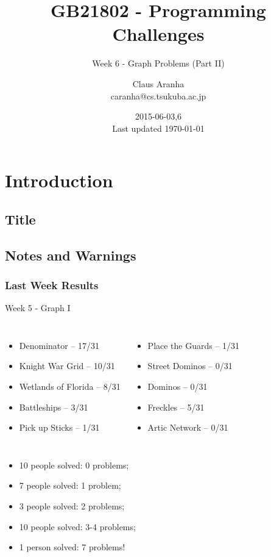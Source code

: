 \documentclass{beamer}
\title[GB21802]{GB21802 - Programming Challenges}
\subtitle[]{Week 6 - Graph Problems (Part II)}
\author[Claus Aranha]{Claus Aranha\\{\footnotesize caranha@cs.tsukuba.ac.jp}}
\institute{College of Information Science}
\date{2015-06-03,6\\{\tiny Last updated \today}}
\begin{document}
\section{Introduction}
\subsection{Title}
\begin{frame}
\maketitle
\end{frame}

\subsection{Notes and Warnings}

\begin{frame}
  \frametitle{Last Week Results}
  \begin{block}{Week 5 - Graph I}
  \begin{columns}[T]
    \begin{itemize}
    \item Denominator -- 17/31
    \item Knight War Grid -- 10/31
    \item Wetlands of Florida -- 8/31
    \item Battleships -- 3/31
    \item Pick up Sticks -- 1/31
    \end{itemize}
    \begin{itemize}
    \item Place the Guards -- 1/31
    \item Street Dominos -- 0/31
    \item Dominos -- 0/31
    \item Freckles -- 5/31
    \item Artic Network -- 0/31
    \end{itemize}
  \end{columns}

  \medskip
  {\smaller
    \begin{itemize}
      \item 10 people solved: 0 problems;
      \item 7 people solved: 1 problem;
      \item 3 people solved: 2 problems;
      \item 10 people solved: 3-4 problems;
      \item 1 person solved: 7 problems!
    \end{itemize}
  }
  \end{block}
\end{frame}
\end{document}
